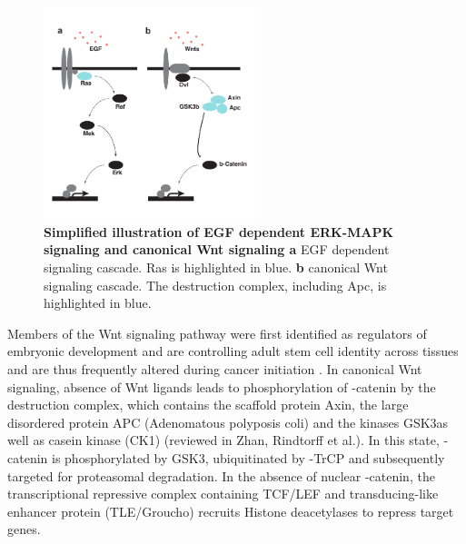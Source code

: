 \begin{flushleft}
\begin{figure}[h]
\centering
\includegraphics[width=0.55\textwidth,
                keepaspectratio]{figures/adenomaprofiling/pdf/fig_0_1.pdf}
\caption[Simplified illustration of ERK-MAPK signaling and canonical Wnt signaling]{\textbf{Simplified illustration of EGF dependent ERK-MAPK signaling and canonical Wnt signaling a} EGF dependent signaling cascade. Ras is highlighted in blue. \textbf{b} canonical Wnt signaling cascade. The destruction complex, including Apc, is highlighted in blue.}
\label{fig_180}
\end{figure}
\bigbreak


Members of the Wnt signaling pathway were first identified as regulators of embryonic development \cite{Sharma1973WinglessMelanogaster} and are controlling adult stem cell identity across tissues and are thus frequently altered during cancer initiation \cite{Nusslein-Volhard1980MutationsDrosophila}. In canonical Wnt signaling, absence of Wnt ligands leads to phosphorylation of \textbeta-catenin by the destruction complex, which contains the scaffold protein Axin, the large disordered protein APC (Adenomatous polyposis coli) and the kinases GSK3\textbeta as well as casein kinase (CK1\textalpha) (reviewed in Zhan, Rindtorff et al.\cite{Zhan2017}). 
In this state, \textbeta-catenin is phosphorylated by GSK3\textbeta, ubiquitinated by \textbeta-TrCP and subsequently targeted for proteasomal degradation. 
In the absence of nuclear \textbeta-catenin, the transcriptional repressive complex containing TCF/LEF and transducing-like enhancer protein (TLE/Groucho) recruits Histone deacetylases to repress target genes. \par 


\end{flushleft}
